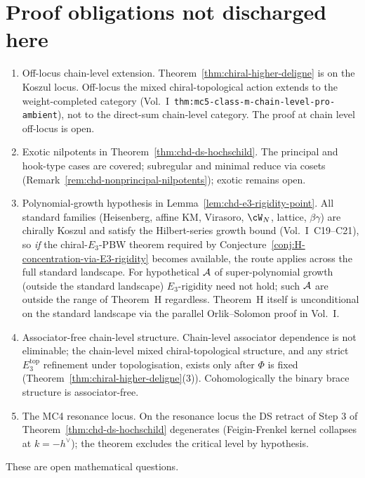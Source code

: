 \section{Proof obligations not discharged here}
\label{sec:chd-not-proved}

\begin{enumerate}
\item Off-locus chain-level extension. Theorem~\ref{thm:chiral-higher-deligne}
is on the Koszul locus. Off-locus the mixed chiral-topological action
extends to the
weight-completed category (Vol.~I~\texttt{thm:mc5-class-m-chain-level-pro-ambient}),
not to the direct-sum chain-level category. The proof at chain level
off-locus is open.

\item Exotic nilpotents in Theorem~\ref{thm:chd-ds-hochschild}. The
principal and hook-type cases are covered; subregular and minimal
reduce via cosets (Remark~\ref{rem:chd-nonprincipal-nilpotents}); exotic
remains open.

\item Polynomial-growth hypothesis in
Lemma~\ref{lem:chd-e3-rigidity-point}. All standard families (Heisenberg,
affine KM, Virasoro, $\cW_N$, lattice, $\beta\gamma$) are chirally
Koszul and satisfy the Hilbert-series growth bound
(Vol.~I~C19--C21), so \emph{if} the chiral-$E_3$-PBW
theorem required by
Conjecture~\ref{conj:H-concentration-via-E3-rigidity} becomes
available, the route applies across the full standard landscape.
For hypothetical $\mathcal{A}$ of super-polynomial growth (outside the
standard landscape) $E_3$-rigidity need not hold; such $\mathcal{A}$ are
outside the range of Theorem~H regardless. Theorem~H itself is
unconditional on the standard landscape via the parallel
Orlik--Solomon proof in Vol.~I.

\item Associator-free chain-level structure. Chain-level associator
dependence is not eliminable; the chain-level mixed
chiral-topological structure, and any strict $E_3^{\mathrm{top}}$
refinement under topologisation, exists only after $\Phi$ is fixed
(Theorem~\ref{thm:chiral-higher-deligne}(3)). Cohomologically the
binary brace structure is associator-free.

\item The MC4 resonance locus. On the resonance locus the DS retract
of Step 3 of Theorem~\ref{thm:chd-ds-hochschild} degenerates
(Feigin-Frenkel kernel collapses at $k = -h^\vee$); the theorem
excludes the critical level by hypothesis.
\end{enumerate}

These are open mathematical questions.

